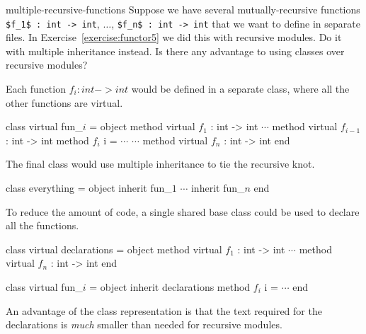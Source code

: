 %
\begin{exercise}{multiple-recursive-functions}
Suppose we have several mutually-recursive functions 
\hbox{\lstinline/$f_1$ : int -> int/}, $\ldots$, \hbox{\lstinline/$f_n$ : int -> int/}
that we want to define in separate files.  In
Exercise~\ref{exercise:functor5} we did this with recursive modules.
Do it with multiple inheritance instead.  Is there any advantage to
using classes over recursive modules?

\begin{answer}\ifanswers
Each function $f_i : int -> int$ would be defined in a separate class,
where all the other functions are virtual.

\begin{ocaml}
class virtual fun_$i$ =
object
   method virtual $f_1$ : int -> int
   $\cdots$
   method virtual $f_{i - 1}$ : int -> int
   method $f_i$ i = $\cdots$
   $\cdots$
   method virtual $f_n$ : int -> int
end
\end{ocaml}
%
The final class would use multiple inheritance to tie the recursive knot.
%
\begin{ocaml}
class everything =
object
   inherit fun_$1$ $\cdots$ inherit fun_$n$
end
\end{ocaml}
%
To reduce the amount of code, a single shared base class could be used
to declare all the functions.

\begin{ocaml}
class virtual declarations =
object
   method virtual $f_1$ : int -> int
   $\cdots$
   method virtual $f_n$ : int -> int
end

class virtual fun_$i$ =
object
   inherit declarations
   method $f_i$ i = $\cdots$
end
\end{ocaml}
%
An advantage of the class representation is that the text required
for the declarations is \emph{much} smaller than needed for recursive
modules.
\fi\end{answer}
\end{exercise}

